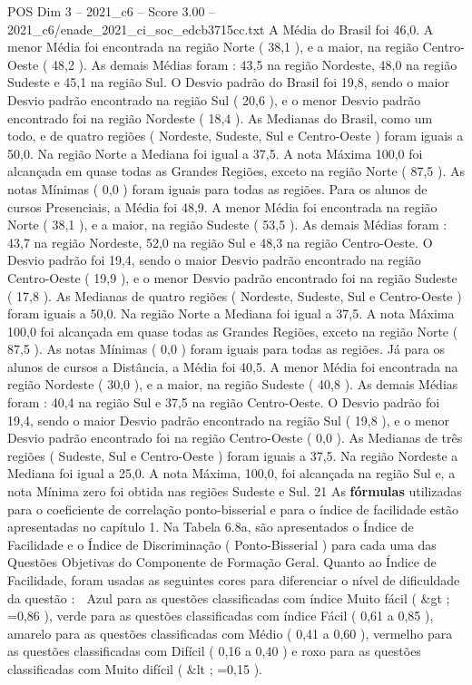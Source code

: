 \begin{textsample}{POS Dim 3 – 2021\_c6 – Score 3.00 – 2021\_c6/enade\_2021\_ci\_soc\_edcb3715cc.txt}
A Média do Brasil foi 46,0.
A menor Média foi encontrada na região Norte ( 38,1 ), e a maior, na região Centro-Oeste ( 48,2 ).
As demais Médias foram : 43,5 na região Nordeste, 48,0 na região Sudeste e 45,1 na região Sul.
O Desvio padrão do Brasil foi 19,8, sendo o maior Desvio padrão encontrado na região Sul ( 20,6 ), e o menor Desvio padrão encontrado foi na região Nordeste ( 18,4 ).
As Medianas do Brasil, como um todo, e de quatro regiões ( Nordeste, Sudeste, Sul e Centro-Oeste ) foram iguais a 50,0.
Na região Norte a Mediana foi igual a 37,5.
A nota Máxima 100,0 foi alcançada em quase todas as Grandes Regiões, exceto na região Norte ( 87,5 ).
As notas Mínimas ( 0,0 ) foram iguais para todas as regiões.
Para os alunos de cursos Presenciais, a Média foi 48,9.
A menor Média foi encontrada na região Norte ( 38,1 ), e a maior, na região Sudeste ( 53,5 ).
As demais Médias foram : 43,7 na região Nordeste, 52,0 na região Sul e 48,3 na região Centro-Oeste.
O Desvio padrão foi 19,4, sendo o maior Desvio padrão encontrado na região Centro-Oeste ( 19,9 ), e o menor Desvio padrão encontrado foi na região Sudeste ( 17,8 ).
As Medianas de quatro regiões ( Nordeste, Sudeste, Sul e Centro-Oeste ) foram iguais a 50,0.
Na região Norte a Mediana foi igual a 37,5.
A nota Máxima 100,0 foi alcançada em quase todas as Grandes Regiões, exceto na região Norte ( 87,5 ).
As notas Mínimas ( 0,0 ) foram iguais para todas as regiões.
Já para os alunos de cursos a Distância, a Média foi 40,5.
A menor Média foi encontrada na região Nordeste ( 30,0 ), e a maior, na região Sudeste ( 40,8 ).
As demais Médias foram : 40,4 na região Sul e 37,5 na região Centro-Oeste.
O Desvio padrão foi 19,4, sendo o maior Desvio padrão encontrado na região Sul ( 19,8 ), e o menor Desvio padrão encontrado foi na região Centro-Oeste ( 0,0 ).
As Medianas de três regiões ( Sudeste, Sul e Centro-Oeste ) foram iguais a 37,5.
Na região Nordeste a Mediana foi igual a 25,0.
A nota Máxima, 100,0, foi alcançada na região Sul e, a nota Mínima zero foi obtida nas regiões Sudeste e Sul. 21 As \textbf{fórmulas} utilizadas para o coeficiente de correlação ponto-bisserial e para o índice de facilidade estão apresentadas no capítulo 1.
Na Tabela 6.8a, são apresentados o Índice de Facilidade e o Índice de Discriminação ( Ponto-Bisserial ) para cada uma das Questões Objetivas do Componente de Formação Geral.
Quanto ao Índice de Facilidade, foram usadas as seguintes cores para diferenciar o nível de dificuldade da questão :  Azul para as questões classificadas com índice Muito fácil ( \&gt ; =0,86 ), verde para as questões classificadas com índice Fácil ( 0,61 a 0,85 ), amarelo para as questões classificadas com Médio ( 0,41 a 0,60 ), vermelho para as questões classificadas com Difícil ( 0,16 a 0,40 ) e roxo para as questões classificadas com Muito difícil ( \&lt ; =0,15 ).

\end{textsample}
